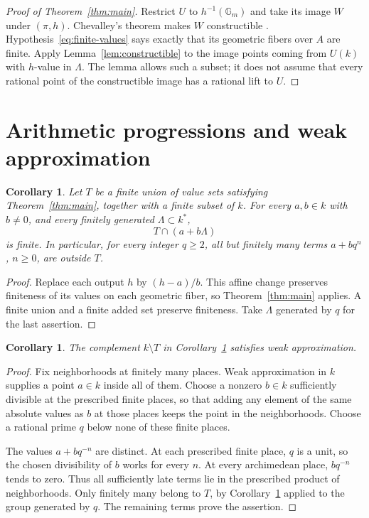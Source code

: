 \documentclass[11pt,a4paper]{article}
\newtheorem{corollary}[theorem]{Corollary}
\theoremstyle{definition}
\newcommand{\Gm}{\mathbb G_m}\newcommand{\Ok}{\mathcal O_k}
\begin{document}
\begin{proof}[Proof of Theorem~\ref{thm:main}]
Restrict $U$ to $h^{-1}(\Gm)$ and take its image $W$ under
$(\pi,h)$. Chevalley's theorem makes $W$ constructible
\cite[Tag 054K]{Stacks}. Hypothesis~\eqref{eq:finite-values}
says exactly that its geometric fibers over $A$ are finite.
Apply Lemma~\ref{lem:constructible} to the image points coming
from $U(k)$ with $h$-value in $\Lambda$. The lemma allows such
a subset; it does not assume that every rational point of the
constructible image has a rational lift to $U$.
\end{proof}

\section{Arithmetic progressions and weak approximation}

\begin{corollary}\label{cor:affine-units}
Let $T$ be a finite union of value sets satisfying
Theorem~\ref{thm:main}, together with a finite subset of $k$.
For every $a,b\in k$ with $b\ne0$, and every finitely generated
$\Lambda\subset k^*$,
\[
                           T\cap(a+b\Lambda)
\]
is finite. In particular, for every integer $q\ge2$, all but
finitely many terms $a+bq^n$, $n\ge0$, are outside $T$.
\end{corollary}
\begin{proof}
Replace each output $h$ by $(h-a)/b$. This affine change preserves
finiteness of its values on each geometric fiber, so
Theorem~\ref{thm:main} applies. A finite union and a finite added
set preserve finiteness. Take $\Lambda$ generated by $q$ for the
last assertion.
\end{proof}

\begin{corollary}\label{cor:weak}
The complement $k\setminus T$ in Corollary~\ref{cor:affine-units}
satisfies weak approximation.
\end{corollary}
\begin{proof}
Fix neighborhoods at finitely many places. Weak approximation in
$k$ supplies a point $a\in k$ inside all of them. Choose a nonzero
$b\in k$ sufficiently divisible at the prescribed finite places,
so that adding any element of the same absolute values as $b$ at
those places keeps the point in the neighborhoods. Choose a rational
prime $q$ below none of these finite places.

The values $a+bq^{-n}$ are distinct. At each prescribed finite
place, $q$ is a unit, so the chosen divisibility of $b$ works for
every $n$. At every archimedean place, $bq^{-n}$ tends to zero.
Thus all sufficiently late terms lie in the prescribed product of
neighborhoods. Only finitely many belong to $T$, by
Corollary~\ref{cor:affine-units} applied to the group generated
by $q$. The remaining terms prove the assertion.
\end{proof}
\end{document}
